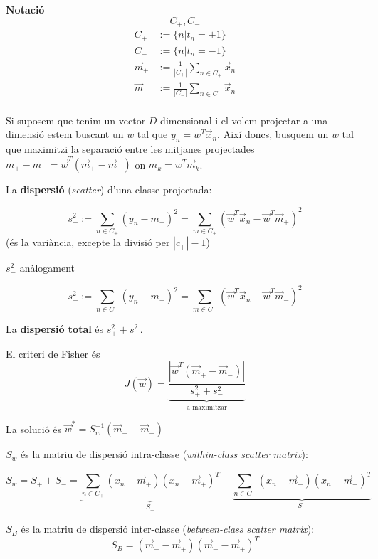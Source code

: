 \documentclass[a4paper]{article}
\begin{document}

\textbf{Notació}
$$  C_+, C_-  $$
\begin{align*}
	C_+ &:= \{ n | t_n = +1 \} \\
	C_- &:= \{ n | t_n = -1 \} \\
	\vec{m}_+ &:= \frac{1}{|C_+|} \sum_{n\in C_+} \vec{x}_n \\
	\vec{m}_- &:= \frac{1}{|C_-|} \sum_{n\in C_-} \vec{x}_n \\
\end{align*}

Si suposem que tenim un vector $D$-dimensional i el volem projectar a una dimensió estem buscant un $w$ tal que $y_n = w^T \vec{x}_n$. Així doncs, busquem un $w$ tal que maximitzi la separació entre les mitjanes projectades $m_+ - m_- = \vec{w}^T(\vec{m}_+ - \vec{m}_-)$ on $m_k = w^T \vec{m}_k$.

La \textbf{dispersió} (\emph{scatter}) d'una classe projectada:

$$  
s_+^2 := \sum_{n \in C_+} (y_n - m_+)^2 = 
\sum_{m \in C_+} (\vec{w}^T \vec{x}_n - \vec{w}^T \vec{m}_+)^2
$$
(és la variància, excepte la divisió per $|c_+| - 1$)

$s_-^2$ anàlogament 

$$
s_-^2 := \sum_{n \in C_-} (y_n - m_-)^2 = 
\sum_{m \in C_-} (\vec{w}^T \vec{x}_n - \vec{w}^T \vec{m}_-)^2
$$

La \textbf{dispersió total} és $s_+^2 + s_-^2$.

El criteri de Fisher és $$  J(\vec{w}) = \underbrace{\frac{|\vec{w}^T(\vec{m}_+-\vec{m}_-)|}{s_+^2 + s_-^2}}_\text{a maximitzar}  $$

La solució és $\vec{w}^* = S_w^{-1}(\vec{m}_- - \vec{m}_+)$

$S_w$ és la matriu de dispersió intra-classe (\emph{within-class scatter matrix}):

$$
S_w = S_+ + S_- = 
\underbrace{\sum_{n \in C_+} (x_n - \vec{m}_+)(x_n - \vec{m}_+)^T}_{S_+} +
\underbrace{\sum_{n \in C_-} (x_n - \vec{m}_-)(x_n - \vec{m}_-)^T}_{S_-}  
$$


$S_B$ és la matriu de dispersió inter-classe (\emph{between-class scatter matrix}):
$$
S_B = (\vec{m}_- - \vec{m}_+)(\vec{m}_- - \vec{m}_+)^T
$$

	
\end{document}
